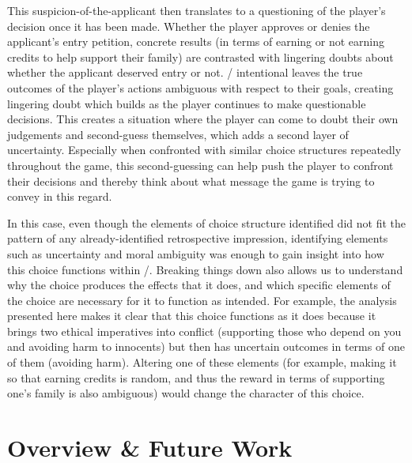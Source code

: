 This suspicion-of-the-applicant then translates to a questioning of the player's decision once it has been made.
%
Whether the player approves or denies the applicant's entry petition, concrete results (in terms of earning or not earning credits to help support their family) are contrasted with lingering doubts about whether the applicant deserved entry or not.
%
\papersplease/ intentional leaves the true outcomes of the player's actions ambiguous with respect to their goals, creating lingering doubt which builds as the player continues to make questionable decisions.
%
This creates a situation where the player can come to doubt their own judgements and second-guess themselves, which adds a second layer of uncertainty.
%
Especially when confronted with similar choice structures repeatedly throughout the game, this second-guessing can help push the player to confront their decisions and thereby think about what message the game is trying to convey in this regard.


In this case, even though the elements of choice structure identified did not fit the pattern of any already-identified retrospective impression, identifying elements such as uncertainty and moral ambiguity was enough to gain insight into how this choice functions within \papersplease/.
%
Breaking things down also allows us to understand why the choice produces the effects that it does, and which specific elements of the choice are necessary for it to function as intended.
%
For example, the analysis presented here makes it clear that this choice functions as it does because it brings two ethical imperatives into conflict (supporting those who depend on you and avoiding harm to innocents) but then has uncertain outcomes in terms of one of them (avoiding harm).
%
Altering one of these elements (for example, making it so that earning credits is random, and thus the reward in terms of supporting one's family is also ambiguous) would change the character of this choice.


\section{Overview \& Future Work}

